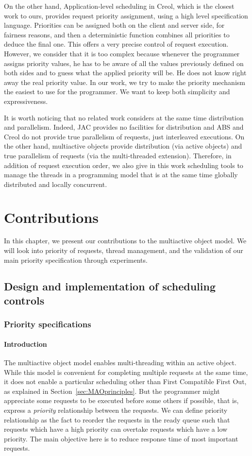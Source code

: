 \documentclass[11pt]{report}
\begin{document}
On the other hand, Application-level scheduling in Creol, which is the closest work to ours, provides request priority assignment, using a high level specification language. Priorities can be assigned both on the client and server side, for fairness reasons, and then a deterministic function combines all priorities to deduce the final one. This offers a very precise control of request execution. However, we consider that it is too complex because whenever the programmer assigns priority values, he has to be aware of all the values previously defined on both sides and to guess what the applied priority will be. He does not know right away the real priority value. In our work, we try to make the priority mechanism the easiest to use for the programmer. We want to keep both simplicity and expressiveness.

It is worth noticing that no related work considers at the same time distribution and parallelism. Indeed, JAC provides no facilities for distribution and ABS and Creol do not provide true parallelism of requests, just interleaved executions. On the other hand, multiactive objects provide distribution (via active objects) and true parallelism of requests (via the multi-threaded extension). Therefore, in addition of request execution order, we also give in this work scheduling tools to manage the threads in a programming model that is at the same time globally distributed and locally concurrent.

\chapter{Contributions}\label{sec:contributions}
In this chapter, we present our contributions to the multiactive object model. We will look into priority of requests, thread management, and the validation of our main priority specification through experiments.

\section{Design and implementation of scheduling controls}
\subsection{Priority specifications}
\subsubsection{Introduction}
The multiactive object model enables multi-threading within an active object. While this model is convenient for completing multiple requests at the same time, it does not enable a particular scheduling other than First Compatible First Out, as explained in Section~\ref{sec:MAOprinciples}. But the programmer might appreciate some requests to be executed before some others if possible, that is, express a \emph{priority} relationship between the requests. 
We can define priority relationship as the fact to reorder the requests in the ready queue such that requests which have a high priority can overtake requests which have a low priority. 
The main objective here is to reduce response time of most important requests. 
\end{document}
